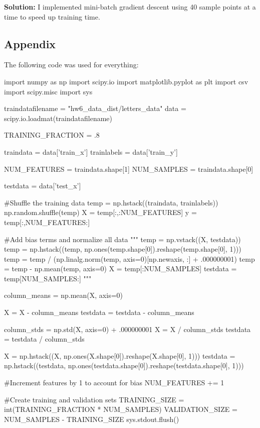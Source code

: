\documentclass{article}
\newcommand{\solution}{\textbf{Solution: }}
\begin{document}
\begin{mdframed}
\solution I implemented mini-batch gradient descent using 40 sample points at a time to speed up training time.
\end{mdframed}

\newpage

\subsection*{Appendix}
The following code was used for everything:

\begin{python}
import numpy as np
import scipy.io
import matplotlib.pyplot as plt
import csv
import scipy.misc
import sys

traindatafilename = "hw6_data_dist/letters_data"
data = scipy.io.loadmat(traindatafilename)

TRAINING_FRACTION = .8

traindata = data['train_x']
trainlabels = data['train_y']

NUM_FEATURES = traindata.shape[1]
NUM_SAMPLES = traindata.shape[0]

testdata = data['test_x']

#Shuffle the training data
temp = np.hstack((traindata, trainlabels))
np.random.shuffle(temp)
X = temp[:,:NUM_FEATURES]
y = temp[:,NUM_FEATURES:]

#Add bias terms and normalize all data
"""
temp = np.vstack((X, testdata))
temp = np.hstack((temp, np.ones(temp.shape[0]).reshape(temp.shape[0], 1)))
temp = temp / (np.linalg.norm(temp, axis=0)[np.newaxis, :] + .000000001)
temp = temp - np.mean(temp, axis=0)
X = temp[:NUM_SAMPLES]
testdata = temp[NUM_SAMPLES:]
"""

column_means = np.mean(X, axis=0)

X = X - column_means
testdata = testdata - column_means

column_stds = np.std(X, axis=0) + .000000001
X = X / column_stds
testdata = testdata / column_stds

X = np.hstack((X, np.ones(X.shape[0]).reshape(X.shape[0], 1)))
testdata = np.hstack((testdata, np.ones(testdata.shape[0]).reshape(testdata.shape[0], 1)))

#Increment features by 1 to account for bias
NUM_FEATURES += 1

#Create training and validation sets
TRAINING_SIZE = int(TRAINING_FRACTION * NUM_SAMPLES)
VALIDATION_SIZE = NUM_SAMPLES - TRAINING_SIZE
sys.stdout.flush()


\end{python}
\end{document}
